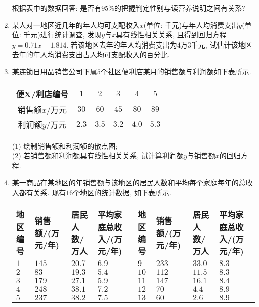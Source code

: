 \documentclass[10pt,a4paper]{article}
\begin{document}
\begin{enumerate}[1.]
\begin{center}
\begin{tabular}{|c|c|c|c|}
    \end{tabular}
\end{center}
根据表中的数据回答: 是否有$95\%$的把握判定性别与读营养说明之间有关系?
\item 某人对一地区近几年的年人均可支配收入$x$(单位: 千元)与年人均消费支出$y$(单位: 千元)进行统计调查, 发现$y$与$x$具有线性相关关系, 且得到回归方程$y=0.71x-1.814$. 若该地区去年的年人均消费支出为$4$万$3$千元, 试估计该地区去年的年人均消费支出占人均可支配收入的百分比.
\item 某连锁日用品销售公司下属$5$个社区便利店某月的销售额与利润额如下表所示.
\begin{center}
    \begin{tabular}{|c|c|c|c|c|c|}
        \hline
        便X/利店编号 & $1$ & $2$ & $3$ & $4$ & $5$\\ \hline 
        销售额$x/$万元 & $30$ & $60$ & $45$ & $80$ & $89$\\ \hline 
        利润额$y/$万元 & $2.3$ & $3.5$ & $3.2$ & $4.0$ & $5.3$\\ \hline 
    \end{tabular}
\end{center}
(1) 绘制销售额和利润额的散点图;\\
(2) 若销售额和利润额具有线性相关关系, 试计算利润额$y$与销售额$x$的回归方程.
\item 某一商品在某地区的年销售额与该地区的居民人数和平均每个家庭每年的总收入都有关系. 现有$16$个地区的统计数据, 如下表所示.
\begin{center}
    \begin{tabular}{|p{}<{\centering}|p{}<{\centering}|p{}<{\centering}|p{}<{\centering}||p{}<{\centering}|p{}<{\centering}|p{}<{\centering}|p{}<{\centering}|}
        \hline
        地区编号 & 销售额/(万元/年) & 居民人数/万人 & 平均家庭总收入/(万元/年) & 地区编号 & 销售额/(万元/年) & 居民人数/万人 & 平均家庭总收入/(万元/年)\\ \hline 
        $1$ & $145$ & $20.7$ & $6.9$ & $9$ & $233$ & $33.0$ & $8.3$\\ \hline 
        $2$ & $83$ & $19.3$ & $5.4$ & $10$ & $112$ & $11.5$ & $8.3$\\ \hline 
        $3$ & $179$ & $27.1$ & $5.9$ & $11$ & $147$ & $16.1$ & $8.4$\\ \hline 
        $4$ & $248$ & $38.1$ & $7.2$ & $12$ & $70$ & $4.4$ & $8.9$\\ \hline 
        $5$ & $237$ & $38.2$ & $7.5$ & $13$ & $60$ & $2.6$ & $8.9$\\ \hline 

\end{tabular}
\end{center}
\end{enumerate}
\end{document}
